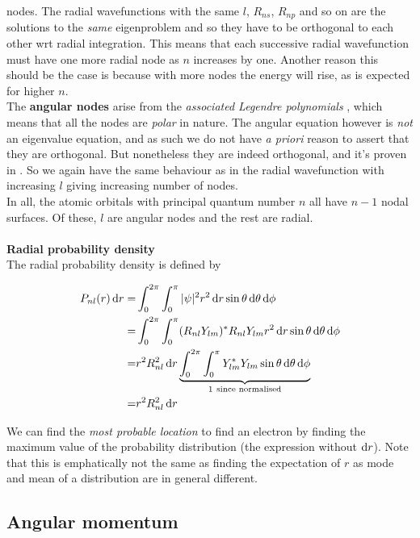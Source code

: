 nodes. The radial wavefunctions with the same $l$, \ie $R_{ns}$, $R_{np}$ and so 
on are the solutions to the \textit{same} eigenproblem and so they have to be 
orthogonal to each other wrt radial integration. This means that each successive 
radial wavefunction must have one more radial node as $n$ increases by one. 
Another reason this should be the case is because with more nodes the energy will 
rise, as is expected for higher $n$. \\
The \textbf{angular nodes} arise from the \textit{associated Legendre polynomials} 
, which means that all the nodes are \textit{polar} in nature. The angular 
equation however is \textit{not} an eigenvalue equation, and as such 
we do not have \textit{a priori} reason to assert that they are orthogonal. But 
nonetheless they are indeed orthogonal, and it's proven in . 
So we again have the same behaviour as in the radial wavefunction with increasing 
$l$ giving increasing number of nodes. \\
In all, the atomic orbitals with principal quantum number $n$ all have $n-1$ nodal
surfaces. Of these, $l$ are angular nodes and the rest are radial. \\
\ \\
\textbf{Radial probability density}\\
The radial probability density is defined by 
\begin{defi}
\begin{equation}
\begin{aligned}
P_{nl}(r)\dif r=&\int^{2\pi}_0\int^{\pi}_0|\psi|^2r^2\dif r\sin\theta\dif\theta\dif\phi\\
=&\int^{2\pi}_0\int^{\pi}_0(R_{nl}Y_{lm})^*R_{nl}Y_{lm}r^2\dif r\sin\theta\dif\theta\dif\phi\\
=&r^2R_{nl}^2\dif r\underbrace{\int^{2\pi}_0\int^{\pi}_0Y_{lm}^*Y_{lm}\sin\theta\dif\theta\dif\phi}_{1\ \text{since normalised}}\\
=&r^2R_{nl}^2\dif r
\end{aligned}
\end{equation}
\end{defi}
We can find the \textit{most probable location} to find an electron by finding the 
maximum value of the probability distribution (the expression without $\dif r$). 
Note that this is emphatically not the same as finding the expectation of $r$ as 
mode and mean of a distribution are in general different. 
\subsection{Angular momentum}
